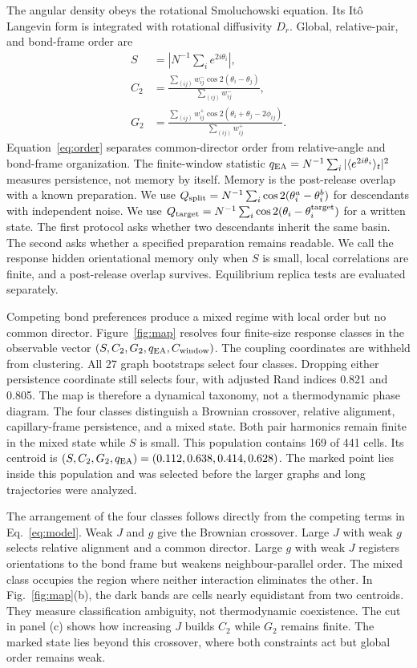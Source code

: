 \documentclass[aps,prl,reprint,superscriptaddress,nofootinbib,floatfix]{revtex4-2}
\begin{document}
The angular density obeys the rotational Smoluchowski equation. Its It\^o
Langevin form is integrated with rotational diffusivity \(D_r\). Global,
relative-pair, and bond-frame order are
\begin{align}
 S&=\left|N^{-1}\sum_i e^{2i\theta_i}\right|,\nonumber\\
 C_2&=\frac{\sum_{(ij)}w^-_{ij}\cos2(\theta_i-\theta_j)}
 {\sum_{(ij)}w^-_{ij}},\nonumber\\
 G_2&=\frac{\sum_{(ij)}w^+_{ij}
 \cos2(\theta_i+\theta_j-2\phi_{ij})}{\sum_{(ij)}w^+_{ij}}.
 \label{eq:order}
\end{align}
Equation~\eqref{eq:order} separates common-director order from relative-angle
and bond-frame organization. The finite-window statistic
\(q_{\rm EA}=N^{-1}\sum_i|\langle e^{2i\theta_i}\rangle_t|^2\) measures
persistence, not memory by itself. Memory is the post-release overlap with a
known preparation. We use
\(Q_{\rm split}=N^{-1}\sum_i\cos2(\theta_i^{a}-\theta_i^{b})\) for descendants
with independent noise. We use
\(Q_{\rm target}=N^{-1}\sum_i\cos2(\theta_i-\theta_i^{\rm target})\) for a
written state.
The first protocol asks whether two descendants inherit the same basin. The
second asks whether a specified preparation remains readable. We call the
response hidden orientational memory only when \(S\) is small, local
correlations are finite, and a post-release overlap survives. Equilibrium
replica tests are evaluated separately.

Competing bond preferences produce a mixed regime with local order but no
common director. Figure~\ref{fig:map} resolves four finite-size response
classes in the observable vector
\((S,C_2,G_2,q_{\rm EA},C_{\rm window})\). The coupling
coordinates are withheld from clustering. All 27 graph bootstraps select four
classes. Dropping either persistence coordinate still selects four, with
adjusted Rand indices 0.821 and 0.805. The map is therefore a dynamical
taxonomy, not a thermodynamic phase diagram.
The four classes distinguish a Brownian crossover, relative alignment,
capillary-frame persistence, and a mixed state. Both pair harmonics remain
finite in the mixed state while \(S\) is small. This population contains 169
of 441 cells. Its centroid is
\((S,C_2,G_2,q_{\rm EA})=(0.112,0.638,0.414,0.628)\).
The marked point lies inside this population and was selected before the
larger graphs and long trajectories were analyzed.

The arrangement of the four classes follows directly from the competing
terms in Eq.~\eqref{eq:model}. Weak \(J\) and \(g\) give the Brownian
crossover. Large \(J\) with weak \(g\) selects relative alignment and a common
director. Large \(g\) with weak \(J\) registers orientations to the bond
frame but weakens neighbour-parallel order. The mixed class occupies the
region where neither interaction eliminates the other. In Fig.~\ref{fig:map}(b),
the dark bands are cells nearly equidistant from two centroids. They measure
classification ambiguity, not thermodynamic coexistence. The cut in panel (c)
shows how increasing \(J\) builds \(C_2\) while \(G_2\) remains finite. The
marked state lies beyond this crossover, where both constraints act but
global order remains weak.
\end{document}
